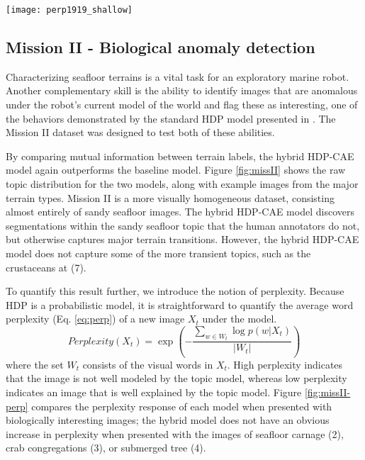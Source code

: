 \documentclass[letterpaper, 10 pt, conference]{ieeeconf}
\begin{document}
\begin{figure*}[thb!]
\centering
\texttt{[image: perp1919\_shallow]}
    \caption{Correlation of perplexity score of the models (c,d,e) with annotated biological anomalies (b) for the Mission II dataset. Example images of biological anomalies are shown in (a). Each image in the dataset was labeled with high, medium, or low perplexity (b). Although all three models do have differential responses in areas of high perplexity, the HDP model using standard features (d) outperforms the hybrid HDP-CAE model (c) and raw reconstruction error from the CAE (e).}    
\label{fig:missII-perp}
\end{figure*}
    
\subsection{Mission II - Biological anomaly detection} 
\label{sec:missII}
Characterizing seafloor terrains is a vital task for an exploratory marine robot. Another complementary skill is the ability to identify images that are anomalous under the robot's current model of the world and flag these as interesting, one of the behaviors demonstrated by the standard HDP model presented in \cite{Girdhar2015}.  The Mission II dataset was designed to test both of these abilities.
    
By comparing mutual information between terrain labels, the hybrid HDP-CAE model again outperforms the baseline model. Figure \ref{fig:missII} shows the raw topic distribution for the two models, along with example images from the major terrain types. Mission II is a more visually homogeneous dataset, consisting almost entirely of sandy seafloor images. The hybrid HDP-CAE model discovers segmentations within the sandy seafloor topic that the human annotators do not, but otherwise captures major terrain transitions. However, the hybrid HDP-CAE model does not capture some of the more transient topics, such as the crustaceans at (7). 
    
To quantify this result further, we introduce the notion of perplexity. Because HDP is a probabilistic model, it is straightforward to quantify the average word perplexity (Eq. \ref{eq:perp}) of a new image $X_t$ under the model. \begin{equation}
\label{eq:perp}
Perplexity(X_t) = \exp\left( -\frac{\sum_{w \in W_t} \log p(w | X_t)}{|W_t|} \right)
\end{equation}
where the set $W_t$ consists of the visual words in $X_t$. High perplexity indicates that the image is not well modeled by the topic model, whereas low perplexity indicates an image that is well explained by the topic model. Figure \ref{fig:missII-perp} compares the perplexity response of each model when presented with biologically interesting images; the hybrid model does not have an obvious increase in perplexity when presented with the images of seafloor carnage (2), crab congregations (3), or submerged tree (4). 
    
\end{document}
